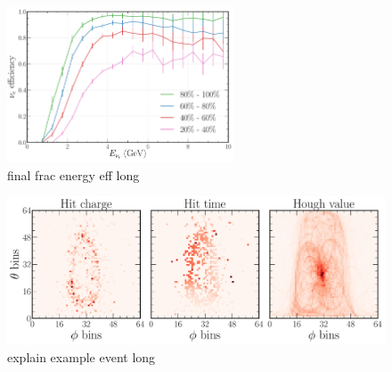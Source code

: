 \begin{figure} %
    \includegraphics[width=0.6\textwidth]{diagrams/6-cvn/chipsnet/final_frac_energy_eff.pdf}
    \caption[final frac energy eff short]
    {final frac energy eff long}
    \label{fig:final_frac_energy_eff}
\end{figure}

\begin{figure} %
    \includegraphics[width=\textwidth]{diagrams/6-cvn/chipsnet/explain_example_event.pdf}
    \caption[explain example event short]
    {explain example event long}
    \label{fig:explain_example_event}
\end{figure}

